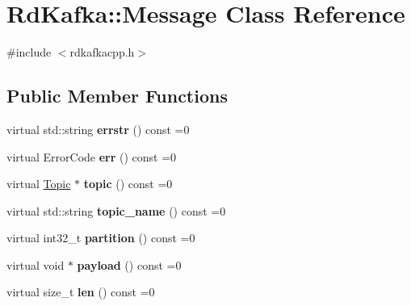 \hypertarget{classRdKafka_1_1Message}{\section{Rd\-Kafka\-:\-:Message Class Reference}
\label{classRdKafka_1_1Message}
}


{\ttfamily \#include $<$rdkafkacpp.\-h$>$}

\subsection*{Public Member Functions}
\begin{DoxyCompactItemize}
\item 
\hypertarget{classRdKafka_1_1Message_a3f3471916c7375945d837b05af05aa94}{virtual std\-::string {\bfseries errstr} () const =0}\label{classRdKafka_1_1Message_a3f3471916c7375945d837b05af05aa94}

\item 
\hypertarget{classRdKafka_1_1Message_a90df1fd2a73a74220c9581e6bedb42f2}{virtual Error\-Code {\bfseries err} () const =0}\label{classRdKafka_1_1Message_a90df1fd2a73a74220c9581e6bedb42f2}

\item 
\hypertarget{classRdKafka_1_1Message_a6eb88c584037280b796500d541251938}{virtual \hyperlink{classRdKafka_1_1Topic}{Topic} $\ast$ {\bfseries topic} () const =0}\label{classRdKafka_1_1Message_a6eb88c584037280b796500d541251938}

\item 
\hypertarget{classRdKafka_1_1Message_a02e16f76e8d248fe47e0f09ff2d13492}{virtual std\-::string {\bfseries topic\-\_\-name} () const =0}\label{classRdKafka_1_1Message_a02e16f76e8d248fe47e0f09ff2d13492}

\item 
\hypertarget{classRdKafka_1_1Message_aebc6b57026d44ade6c75d5e421fa4384}{virtual int32\-\_\-t {\bfseries partition} () const =0}\label{classRdKafka_1_1Message_aebc6b57026d44ade6c75d5e421fa4384}

\item 
\hypertarget{classRdKafka_1_1Message_ae7426658cd22855e80d3169b85ca2d27}{virtual void $\ast$ {\bfseries payload} () const =0}\label{classRdKafka_1_1Message_ae7426658cd22855e80d3169b85ca2d27}

\item 
\hypertarget{classRdKafka_1_1Message_a68d94e027f0df784632880d24a43b3f9}{virtual size\-\_\-t {\bfseries len} () const =0}\label{classRdKafka_1_1Message_a68d94e027f0df784632880d24a43b3f9}


\end{DoxyCompactItemize}
